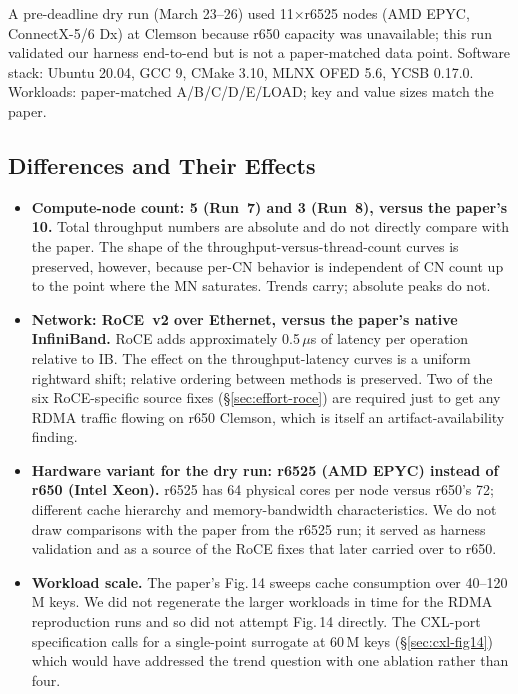 \documentclass[11pt,a4paper]{article}
\begin{document}
A pre-deadline dry run (March 23--26) used 11$\times$r6525 nodes (AMD EPYC, ConnectX-5/6 Dx) at Clemson because r650 capacity was unavailable; this run validated our harness end-to-end but is not a paper-matched data point. Software stack: Ubuntu 20.04, GCC 9, CMake 3.10, MLNX OFED 5.6, YCSB 0.17.0. Workloads: paper-matched A/B/C/D/E/LOAD; key and value sizes match the paper.

\subsection{Differences and Their Effects}

\begin{itemize}[nosep,leftmargin=1em]
    \item \textbf{Compute-node count: 5 (Run~7) and 3 (Run~8), versus the paper's 10.} Total throughput numbers are absolute and do not directly compare with the paper. The shape of the throughput-versus-thread-count curves is preserved, however, because per-CN behavior is independent of CN count up to the point where the MN saturates. Trends carry; absolute peaks do not.
    \item \textbf{Network: RoCE~v2 over Ethernet, versus the paper's native InfiniBand.} RoCE adds approximately 0.5\,$\mu$s of latency per operation relative to IB. The effect on the throughput-latency curves is a uniform rightward shift; relative ordering between methods is preserved. Two of the six RoCE-specific source fixes (\S\ref{sec:effort-roce}) are required just to get any RDMA traffic flowing on r650 Clemson, which is itself an artifact-availability finding.
    \item \textbf{Hardware variant for the dry run: r6525 (AMD EPYC) instead of r650 (Intel Xeon).} r6525 has 64 physical cores per node versus r650's 72; different cache hierarchy and memory-bandwidth characteristics. We do not draw comparisons with the paper from the r6525 run; it served as harness validation and as a source of the RoCE fixes that later carried over to r650.
    \item \textbf{Workload scale.} The paper's Fig.\,14 sweeps cache consumption over 40--120\,M keys. We did not regenerate the larger workloads in time for the RDMA reproduction runs and so did not attempt Fig.\,14 directly. The CXL-port specification calls for a single-point surrogate at 60\,M keys (\S\ref{sec:cxl-fig14}) which would have addressed the trend question with one ablation rather than four.
\end{itemize}
\end{document}
